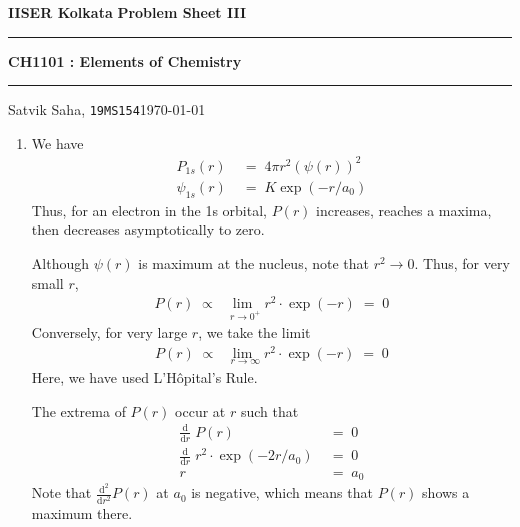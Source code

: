 \documentclass[10pt]{article}
\begin{document}
        \par\textbf{IISER Kolkata} \hfill \textbf{Problem Sheet III}
        \vspace{3pt}
        \hrule
        \vspace{3pt}
        \begin{center}
                \LARGE{\textbf{CH1101 : Elements of Chemistry}}
        \end{center}
        \vspace{3pt}
        \hrule
        \vspace{3pt}
        Satvik Saha, \texttt{19MS154}\hfill\today
        \vspace{20pt}

        \begin{enumerate}
                \item We have
                \begin{align*}
                        P_{1s}(r) \;&=\; 4\pi r^2 \left( \psi(r) \right)^2 \\
                        \psi_{1s}(r) \;&=\; K \exp(-r/a_0)
                \end{align*}
                Thus, for an electron in the 1s orbital, $P(r)$ increases, reaches a maxima, then decreases asymptotically
                to zero.
                
                Although $\psi(r)$ is maximum at the nucleus, note that $r^2 \to 0$. Thus,
                for very small $r$,
                \begin{align*}
                        P(r) \;\propto\; \lim_{\;\;r \to 0^+} r^2 \cdot \exp(-r) \;=\; 0
                \end{align*}
                Conversely, for very large $r$, we take the limit
                \begin{align*}
                        P(r) \;\propto\; \lim_{\;\;r \to \infty} r^2 \cdot \exp(-r) \;=\; 0
                \end{align*}
                Here, we have used L'H\^ opital's Rule.

                The extrema of $P(r)$ occur at $r$ such that 
                \begin{align*}
                        \frac{\mathrm{d} }{\mathrm{d}r}\; P(r) \;&=\; 0 \\
                        \frac{\mathrm{d} }{\mathrm{d}r}\; r^2 \cdot \exp(-2r/a_0) \;&=\; 0 \\
                        r \;&=\; a_0
                \end{align*}
                Note that $\frac{\mathrm{d}^2 }{\mathrm{d}r^2} P(r)$ at $a_0$ is negative, which means that $P(r)$ shows a maximum there.


\end{enumerate}
\end{document}
